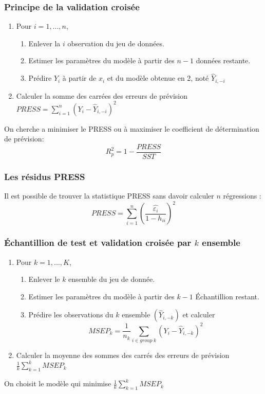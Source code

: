 \documentclass[10pt, french]{article}
\begin{document}
\begin{multicols*}{3}
\subsubsection*{Principe de la validation croisée}
\begin{enumerate}
\item Pour $i = 1, ..., n$,
\begin{enumerate}[label=1.\arabic*]
	\item Enlever la $i$ observation du jeu de données.
	\item Estimer les paramètres du modèle à partir des $n - 1$ données restante.
	\item Prédire $Y_i$ à partir de $x_i$ et du modèle obtenue en 2, noté $\hat{Y}_{i,-i}$
\end{enumerate}
\item Calculer la somme des carrées des erreurs de prévision $PRESS = \sum_{i=1}^n (Y_i - \hat{Y}_{i,-i})^2$
\end{enumerate}
	On cherche a minimiser le PRESS ou à maximiser le coefficient de détermination de prévision:
	\[ R_p^2 = 1 - \frac{PRESS}{SST} \]
\subsubsection*{Les résidus PRESS}
	Il est possible de trouver la statistique PRESS sans davoir calculer $n$ régressions :
	\[ PRESS = \sum_{i=1}^n \left( \frac{\hat{\varepsilon_i}}{1 - h_{ii}} \right)^2 \]
\subsubsection*{Échantillion de test et validation croisée par $k$ ensemble}
\begin{enumerate}
\item Pour $k = 1, ..., K$,
\begin{enumerate}[label=1.\arabic*]
	\item Enlever le $k$ ensemble du jeu de donnée.
	\item  Estimer les paramètres du modèle à partir des $k - 1$ Échantillion restant.
	\item Prédire les observations du $k$ ensemble $(\hat{Y}_{i,-k})$ et calculer
	\[ MSEP_k = \frac{1}{n_k} \sum_{i\in group\:k} (Y_i - \hat{Y}_{i,-k})^2 \]
\end{enumerate}
	\item Calculer la moyenne des sommes des carrés des erreurs de prévision $\frac{1}{k} \sum_{k=1}^k MSEP_k$
\end{enumerate}
	On choisit le modèle qui minimise $\frac{1}{k} \sum_{k=1}^k MSEP_k$



\end{multicols*}
\end{document}
